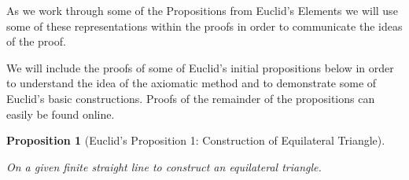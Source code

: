 \documentclass[
]{book}
\newtheorem{proposition}{Proposition}[chapter]
\theoremstyle{definition}
\theoremstyle{definition}
\theoremstyle{definition}
\theoremstyle{definition}
\theoremstyle{remark}
\begin{document}
As we work through some of the Propositions from Euclid's Elements we will use some of these representations within the proofs in order to communicate the ideas of the proof.

We will include the proofs of some of Euclid's initial propositions below in order to understand the idea of the axiomatic method and to demonstrate some of Euclid's basic constructions. Proofs of the remainder of the propositions can easily be found online.

\begin{proposition}[Euclid's Proposition 1: Construction of Equilateral Triangle]
\protect\hypertarget{prp:prop1}{}\label{prp:prop1}

On a given finite straight line to construct an equilateral triangle.

\end{proposition}
\end{document}
